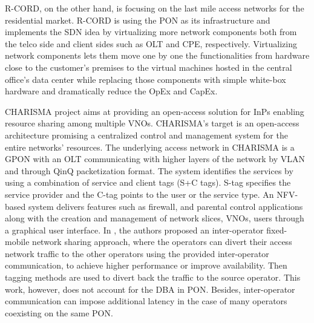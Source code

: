 \ac{R-CORD}, on the other hand, is focusing on the last mile access networks for the residential market. \ac{R-CORD} is using the \ac{PON} as its infrastructure and implements the \ac{SDN} idea by virtualizing more network components both from the telco side and client sides such as \ac{OLT} and \ac{CPE}, respectively. Virtualizing network components lets them move one by one the functionalities from hardware close to the customer's premises to the virtual machines hosted in the central office's data center while replacing those components with simple white-box hardware and dramatically reduce the \ac{OpEx} and \ac{CapEx}.

CHARISMA project \cite{7561040} aims at providing an open-access solution for \acp{InP} enabling resource sharing among multiple \acp{VNO}. CHARISMA's target is an open-access architecture promising a centralized control and management system for the entire networks' resources. The underlying access network in CHARISMA is a \ac{GPON} with an \ac{OLT} communicating with higher layers of the network by \ac{VLAN} and through QinQ packetization format. The system identifies the services by using a combination of service and client tags (S+C tags). S-tag specifies the service provider and the C-tag points to the user or the service type. An \ac{NFV}-based system delivers features such as firewall, and parental control applications along with the creation and management of network slices, \acp{VNO}, users through a graphical user interface.
In \cite{7958548}, the authors proposed an inter-operator fixed-mobile network sharing approach, where the operators can divert their access network traffic to the other operators using the provided inter-operator communication, to achieve higher performance or improve availability. Then tagging methods are used to divert back the traffic to the source operator. This work, however, does not account for the \ac{DBA} in \ac{PON}. Besides, inter-operator communication can impose additional latency in the case of many operators coexisting on the same \ac{PON}.
















